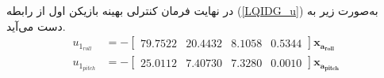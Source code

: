 \documentclass{CCI2020}
\begin{document}
		
	در نهایت فرمان کنترلی بهینه بازیکن اول از رابطه
	(\ref{LQIDG_u})
	به‌صورت زیر به دست می‌آید.
	\begin{equation}
		\begin{split}
			u_{1_{roll}} &= -\begin{bmatrix}
				79.7522 &20.4432 &8.1058 &0.5344 
			\end{bmatrix} \boldsymbol{x_{a_{roll}}} \\
			u_{1_{pitch}} &= -\begin{bmatrix}
				25.0112 &7.40730 &7.3280 &0.0010
			\end{bmatrix} \boldsymbol{x_{a_{pitch}}}
		\end{split}
	\end{equation}
\end{document}
